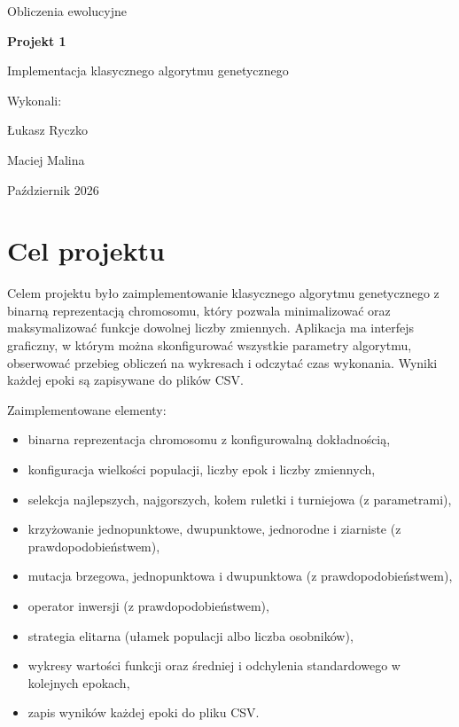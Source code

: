 \documentclass[11pt,a4paper]{article}
\begin{document}
\begin{titlepage}
  \centering
  \vspace*{3cm}
  {\Large Obliczenia ewolucyjne\par}
  \vspace{1.2cm}
  {\Huge\bfseries Projekt 1\par}
  \vspace{0.4cm}
  {\LARGE Implementacja klasycznego algorytmu genetycznego\par}
  \vspace{2.5cm}
  {\large Wykonali:\par}
  \vspace{0.3cm}
  {\Large Łukasz Ryczko\par Maciej Malina\par}
  \vfill
  {\large Październik 2026\par}
\end{titlepage}

\tableofcontents
\newpage

\section{Cel projektu}

Celem projektu było zaimplementowanie klasycznego algorytmu genetycznego z binarną reprezentacją
chromosomu, który pozwala minimalizować oraz maksymalizować funkcje dowolnej liczby zmiennych.
Aplikacja ma interfejs graficzny, w którym można skonfigurować wszystkie parametry algorytmu,
obserwować przebieg obliczeń na wykresach i odczytać czas wykonania. Wyniki każdej epoki są
zapisywane do plików CSV.

Zaimplementowane elementy:
\begin{itemize}
  \item binarna reprezentacja chromosomu z konfigurowalną dokładnością,
  \item konfiguracja wielkości populacji, liczby epok i liczby zmiennych,
  \item selekcja najlepszych, najgorszych, kołem ruletki i turniejowa (z parametrami),
  \item krzyżowanie jednopunktowe, dwupunktowe, jednorodne i ziarniste (z prawdopodobieństwem),
  \item mutacja brzegowa, jednopunktowa i dwupunktowa (z prawdopodobieństwem),
  \item operator inwersji (z prawdopodobieństwem),
  \item strategia elitarna (ułamek populacji albo liczba osobników),
  \item wykresy wartości funkcji oraz średniej i odchylenia standardowego w kolejnych epokach,
  \item zapis wyników każdej epoki do pliku CSV.
\end{itemize}
\end{document}
